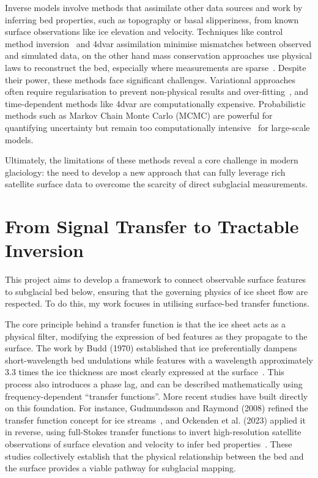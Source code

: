 Inverse models involve methods that assimilate other data sources and work by inferring bed properties, such as topography or basal slipperiness, from known surface observations like ice elevation and velocity. Techniques like control method inversion~\cite{deRydt_2013} and 4dvar assimilation minimise mismatches between observed and simulated data, on the other hand mass conservation approaches use physical laws to reconstruct the bed, especially where measurements are sparse~\cite{Morlighem_2017, Morlighem_2020}. Despite their power, these methods face significant challenges. Variational approaches often require regularisation to prevent non-physical results and over-fitting~\cite{Morlighem_Goldberg_2024}, and time-dependent methods like 4dvar are computationally expensive. Probabilistic methods such as Markov Chain Monte Carlo (MCMC) are powerful for quantifying uncertainty but remain too computationally intensive~\cite{Morlighem_Goldberg_2024} for large-scale models.

Ultimately, the limitations of these methods reveal a core challenge in modern glaciology: the need to develop a new approach that can fully leverage rich satellite surface data to overcome the scarcity of direct subglacial measurements. 

\section{From Signal Transfer to Tractable Inversion}\label{theoretical_frameworks}

This project aims to develop a framework to connect observable surface features to subglacial bed below, ensuring that the governing physics of ice sheet flow are respected. To do this, my work focuses in utilising surface-bed transfer functions.

The core principle behind a transfer function is that the ice sheet acts as a physical filter, modifying the expression of bed features as they propagate to the surface. The work by Budd (1970) established that ice preferentially dampens short-wavelength bed undulations while features with a wavelength approximately $3.3$ times the ice thickness are most clearly expressed at the surface~\cite{Budd_1970}. This process also introduces a phase lag, and can be described mathematically using frequency-dependent ``transfer functions''. More recent studies have built directly on this foundation. For instance, Gudmundsson and Raymond (2008) refined the transfer function concept for ice streams~\cite{Gudmundsson_2008}, and Ockenden et al. (2023) applied it in reverse, using full-Stokes transfer functions to invert high-resolution satellite observations of surface elevation and velocity to infer bed properties~\cite{Ockenden_2023}. These studies collectively establish that the physical relationship between the bed and the surface provides a viable pathway for subglacial mapping.

